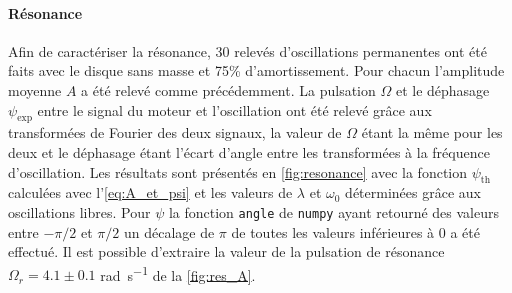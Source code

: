 \paragraph{Résonance}
Afin de caractériser la résonance, 30 relevés d'oscillations permanentes ont été faits avec le disque sans masse et 75\% d'amortissement. Pour chacun l'amplitude moyenne $A$ a été relevé comme précédemment. La pulsation $\Omega$ et le déphasage $\psi_\mathrm{exp}$ entre le signal du moteur et l'oscillation ont été relevé grâce aux transformées de Fourier des deux signaux, la valeur de $\Omega$ étant la même pour les deux et le déphasage étant l'écart d'angle entre les transformées à la fréquence d'oscillation. Les résultats sont présentés en \autoref{fig:resonance} avec la fonction $\psi_\mathrm{th}$ calculées avec l'\autoref{eq:A_et_psi} et les valeurs de $\lambda$ et $\omega_0$ déterminées grâce aux oscillations libres. Pour $\psi$ la fonction \texttt{angle} de \texttt{numpy} ayant retourné des valeurs entre $-\pi/2$ et $\pi/2$ un décalage de $\pi$ de toutes les valeurs inférieures à 0 a été effectué. Il est possible d'extraire la valeur de la pulsation de résonance $\Omega_r = 4.1\pm0.1$ \si{\radian\per\second} de la \autoref{fig:res_A}.

